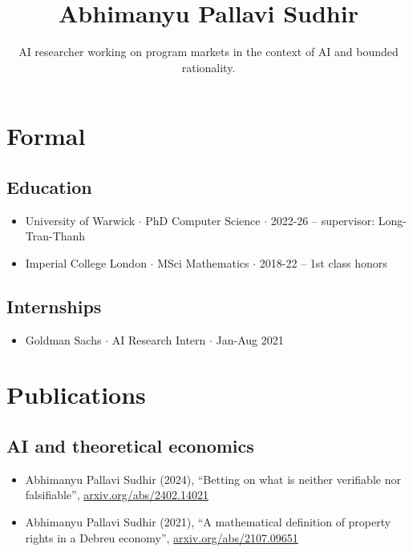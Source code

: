 \documentclass{article}
\title{\Large\bf Abhimanyu Pallavi Sudhir}
\subtitle{AI researcher working on program markets in the context of AI and bounded rationality. \\ %
\vspace{-2em}}
\begin{document}
\begingroup
\let\center\flushleft
\let\endcenter\endflushleft
\maketitle
\endgroup

\section*{Formal}

\subsection*{Education}
\begin{itemize}
    \item University of Warwick $\cdot$ PhD Computer Science $\cdot$ 2022-26 -- supervisor: Long-Tran-Thanh %
    \item Imperial College London $\cdot$ MSci Mathematics $\cdot$ 2018-22 -- 1st class honors
\end{itemize}

\subsection*{Internships}
\begin{itemize}
    \item Goldman Sachs $\cdot$ AI Research Intern $\cdot$ Jan-Aug 2021%
\end{itemize}

\section*{Publications}

\subsection*{AI and theoretical economics}

\begin{itemize}

\item 
Abhimanyu Pallavi Sudhir (2024), ``Betting on what is neither verifiable nor falsifiable'', \href{https://arxiv.org/abs/2402.14021}{arxiv.org/abs/2402.14021}

\item
Abhimanyu Pallavi Sudhir (2021),
``A mathematical definition of property rights in a Debreu economy'', 
\href{https://arxiv.org/abs/2107.09651}{arxiv.org/abs/2107.09651}

\end{itemize}
\end{document}
